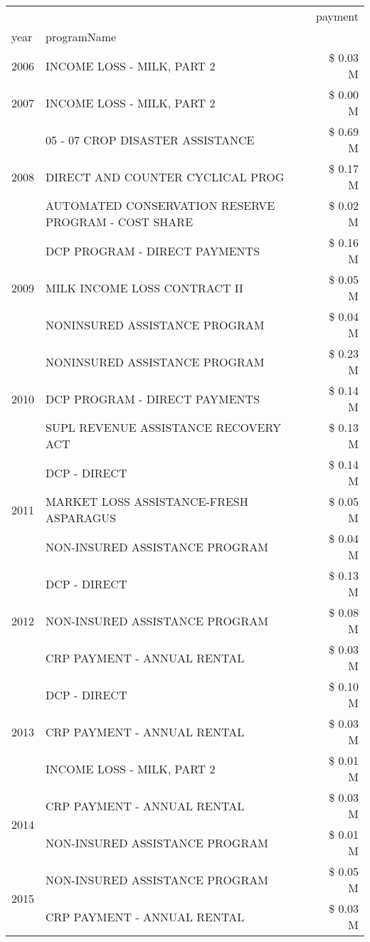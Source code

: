 \begin{tabular}{llr}
\toprule
 &  & payment \\
year & programName &  \\
\midrule
2006 & INCOME LOSS - MILK, PART 2 & \$ 0.03 M \\
\cline{1-3}
2007 & INCOME LOSS - MILK, PART 2 & \$ 0.00 M \\
\cline{1-3}
\multirow[t]{3}{*}{2008} & 05 - 07 CROP DISASTER ASSISTANCE & \$ 0.69 M \\
 & DIRECT AND COUNTER CYCLICAL PROG & \$ 0.17 M \\
 & AUTOMATED CONSERVATION RESERVE PROGRAM - COST SHARE & \$ 0.02 M \\
\cline{1-3}
\multirow[t]{3}{*}{2009} & DCP PROGRAM - DIRECT PAYMENTS & \$ 0.16 M \\
 & MILK INCOME LOSS CONTRACT II & \$ 0.05 M \\
 & NONINSURED ASSISTANCE PROGRAM & \$ 0.04 M \\
\cline{1-3}
\multirow[t]{3}{*}{2010} & NONINSURED ASSISTANCE PROGRAM & \$ 0.23 M \\
 & DCP PROGRAM - DIRECT PAYMENTS & \$ 0.14 M \\
 & SUPL REVENUE ASSISTANCE RECOVERY ACT & \$ 0.13 M \\
\cline{1-3}
\multirow[t]{3}{*}{2011} & DCP - DIRECT & \$ 0.14 M \\
 & MARKET LOSS ASSISTANCE-FRESH ASPARAGUS & \$ 0.05 M \\
 & NON-INSURED ASSISTANCE PROGRAM & \$ 0.04 M \\
\cline{1-3}
\multirow[t]{3}{*}{2012} & DCP - DIRECT & \$ 0.13 M \\
 & NON-INSURED ASSISTANCE PROGRAM & \$ 0.08 M \\
 & CRP PAYMENT - ANNUAL RENTAL & \$ 0.03 M \\
\cline{1-3}
\multirow[t]{3}{*}{2013} & DCP - DIRECT & \$ 0.10 M \\
 & CRP PAYMENT - ANNUAL RENTAL & \$ 0.03 M \\
 & INCOME LOSS - MILK, PART 2 & \$ 0.01 M \\
\cline{1-3}
\multirow[t]{2}{*}{2014} & CRP PAYMENT - ANNUAL RENTAL & \$ 0.03 M \\
 & NON-INSURED ASSISTANCE PROGRAM & \$ 0.01 M \\
\cline{1-3}
\multirow[t]{3}{*}{2015} & NON-INSURED ASSISTANCE PROGRAM & \$ 0.05 M \\
 & CRP PAYMENT - ANNUAL RENTAL & \$ 0.03 M \\

\end{tabular}
